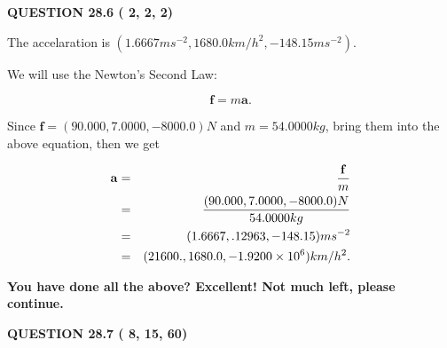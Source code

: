 \documentclass[12pt]{article}
\begin{document}
 
 
  
\vspace{0.2in}
  
{\textbf{\Large{QUESTION
28.6 
 (          2,          2,          2)
}}}
  
  
 
 
\noindent{}
 
 
The accelaration is
$(
1.6667ms^{-2},
1680.0km/h^2,
-148.15ms^{-2}
).
$
 
 
 
 
 
 
\noindent{}

We will use the Newton's Second Law:
 
\[
\mathbf{f}=m\mathbf{a}.
\]
 
Since $\mathbf{f}=( %
90.000,  %
7.0000,  %
-8000.0 )N$
and $m= %
54.0000kg$, bring them into the above equation, then we get
 
\begin{eqnarray*}
\mathbf{a}&=&\frac{\mathbf{f}}m  \\
&=&\frac{(
90.000 ,
7.0000 ,
-8000.0 )N
}{ %
54.0000 kg}  \\
&=&(
1.6667 ,
.12963,
-148.15
)ms^{-2} \\
&=&(
21600. ,
1680.0 ,
-1.9200 \times 10^{6}
)km/h^2.
\end{eqnarray*}
 
 
 
   
   
\vspace{0.3in}
{\textbf{\LARGE{You have done all the above? Excellent! Not much left, please continue.}}}
\vspace{0.3in}
   
   
  
\vspace{0.2in}
  
{\textbf{\Large{QUESTION
28.7 
 (          8,         15,         60)
}}}
  
  
 
 
\noindent{}
\end{document}
